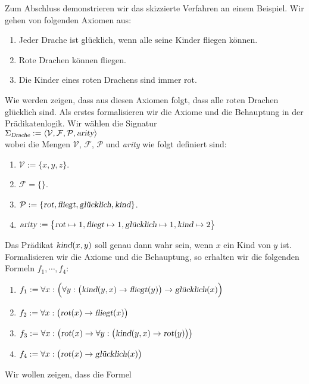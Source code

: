 \exampleEng
Zum Abschluss demonstrieren wir das skizzierte Verfahren an einem Beispiel.
Wir gehen von folgenden Axiomen aus:
\begin{enumerate}
\item Jeder Drache ist glücklich, wenn alle seine Kinder fliegen können.
\item Rote Drachen können fliegen.
\item Die Kinder eines roten Drachens sind immer rot.
\end{enumerate}
Wie werden zeigen, dass aus diesen Axiomen folgt, dass alle roten Drachen glücklich sind.
Als erstes formalisieren wir die Axiome und die Behauptung in der Prädikatenlogik.
Wir wählen die Signatur \\[0.2cm]
\hspace*{1.3cm}  $\Sigma_\textsl{Drache} := \langle \mathcal{V}, \mathcal{F}, \mathcal{P}, \textsl{arity} \rangle$ 
\\[0.2cm]
wobei die Mengen $\mathcal{V}$, $\mathcal{F}$, $\mathcal{P}$ und \textsl{arity} wie folgt definiert sind:
\begin{enumerate}
\item $\mathcal{V} := \{x,y,z\}$.
\item $\mathcal{F} = \{\}$.
\item $\mathcal{P} := \{ \textsl{rot}, \textsl{fliegt}, \textsl{glücklich}, \textsl{kind} \}$.
\item $\textsl{arity} := \bigl\{ \textsl{rot} \mapsto 1, \textsl{fliegt} \mapsto 1,
         \textsl{glücklich} \mapsto 1, \textsl{kind} \mapsto 2\bigr\}$
\end{enumerate}
Das Prädikat  $\textsl{kind}(x,y)$ soll genau dann wahr sein, wenn $x$ ein Kind von $y$ ist.
Formalisieren wir die Axiome und die Behauptung, so erhalten wir die folgenden
Formeln $f_1, \cdots, f_4$:
\begin{enumerate}
\item $f_1 := \forall x: \Bigl(\forall y: \big(\textsl{kind}(y,x) \rightarrow \textsl{fliegt}(y)\big) \rightarrow \textsl{glücklich}(x)\Bigr)$
\item $f_2 := \forall x: \bigl(\textsl{rot}(x) \rightarrow \textsl{fliegt}(x)\bigr)$
\item $f_3 := \forall x: \bigl(\textsl{rot}(x) \rightarrow \forall y:\bigl( \textsl{kind}(y,x) \rightarrow \textsl{rot}(y)\bigr)\bigr)$
\item $f_4 := \forall x: \bigl(\textsl{rot}(x) \rightarrow \textsl{glücklich}(x)\bigr)$
\end{enumerate}
Wir wollen zeigen, dass die Formel 
